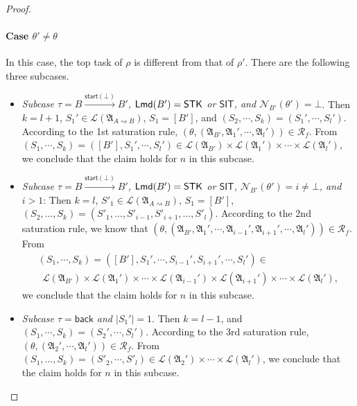 \documentclass[preprint,12pt]{elsarticle}
\newcommand\act{{\sf Act}}
\newcommand\lmd{{\sf Lmd}}
\newcommand\back{{\mathsf{back} }}
\newcommand\startactivity{{\mathsf{start} }}
\newcommand\namefun{\mathcal{N}}
\newcommand\AutReach{\mathscr{R}}
\newcommand{\STK}{\mathsf{STK}}
\newcommand{\SIT}{\mathsf{SIT}}
\newcommand\Aut{{\mathfrak{A} }}
\newcommand\Lang{{\mathscr{L} }}
\newcommand\ConfSet{{\mathscr{C} }}
\begin{document}
\begin{proof}
{\paragraph{Case $\theta' \neq \theta$}
In this case, the top task of $\rho$ is different from that of $\rho'$.  There are the following three subcases. 
\begin{itemize}
    \item \emph{Subcase $\tau = B \xrightarrow{\startactivity(\bot)} B'$, $\lmd(B') = \STK$ or $\SIT$, and $\namefun_{B'}(\theta') = \bot$}. Then $k=l+1$, $S_1' \in \Lang(\Aut_{A\rightsquigarrow B})$, $S_1=[B']$, and $(S_2,\cdots,S_k)=(S_1',\cdots,S_l')$.  According to the 1st saturation rule, $(\theta, (\Aut_{B'}, \Aut_1', \cdots, \Aut_l')) \in \AutReach_f$.
   From $(S_1, \cdots, S_k) = ([B'], S_1', \cdots, S_l') \in \Lang(\Aut_{B'}) \times \Lang(\Aut_1') \times \cdots \times \Lang(\Aut_l')$, we conclude that the claim holds for $n$ in this subcase.
    \item \emph{Subcase $\tau = B \xrightarrow{\startactivity(\bot)} B'$, $\lmd(B')=\STK$ or $\SIT$, $\namefun_{B'}(\theta') = i \neq \bot$, and $i > 1$}: Then $k = l$, 
    $S'_1  \in \Lang(\Aut_{A\rightsquigarrow B})$, $S_1 = [B']$, $(S_2, \dots, S_k) = (S'_1, \dots, S'_{i-1}, S'_{i+1}, \dots, S'_l)$. According to the 2nd saturation rule, we know that $(\theta, (\Aut_{B'}, \Aut_1',\cdots, \Aut_{i-1}', \Aut_{i+1}', \cdots, \Aut_{l}')) \in \AutReach_f$. 
    From 
    $$
    \begin{array}{l}
    	(S_1,\cdots,S_k) = ([B'], S_1', \cdots, S_{i-1}', S_{i+1}', \cdots, S_l') \in \\
    	\ \ \Lang(\Aut_{B'}) \times \Lang(\Aut_1') \times \cdots \times \Lang(\Aut_{i-1}') \times \Lang(\Aut_{i+1}')\times \cdots \times \Lang(\Aut_{l}'),
    \end{array}
    $$  
    we conclude that the claim holds for $n$ in this subcase. 
%
    \item \emph{Subcase $\tau = \back$ and $|S_1'|=1$}. Then $k = l - 1$, and $(S_1,\cdots,S_k) = (S_2',\cdots,S_l')$.  According to the 3rd saturation rule, $(\theta, (\Aut_2',\cdots,\Aut_l')) \in \AutReach_f$. From $(S_1,\dots,S_k) = (S'_2, \cdots, S'_l) \in \Lang(\Aut_2') \times \cdots \times \Lang(\Aut_l')$, we conclude that the claim holds for $n$ in this subcase. 
\end{itemize}
}
\end{proof}
\end{document}
